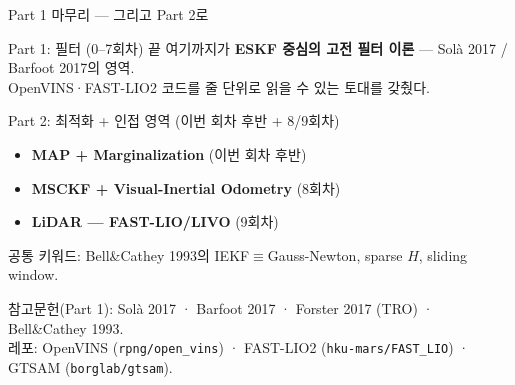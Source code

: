 \begin{frame}{Part 1 마무리 — 그리고 Part 2로}
  \begin{block}{Part 1: 필터 (0--7회차) 끝}
    여기까지가 \textbf{ESKF 중심의 고전 필터 이론} — Solà 2017 / Barfoot 2017의 영역.\\
    OpenVINS·FAST-LIO2 코드를 줄 단위로 읽을 수 있는 토대를 갖췄다.
  \end{block}
  \vspace{0.4em}
  \pause
  \begin{alertblock}{Part 2: 최적화 + 인접 영역 (이번 회차 후반 + 8/9회차)}
    \begin{itemize}
      \item \textbf{MAP + Marginalization} (이번 회차 후반)
      \item \textbf{MSCKF + Visual-Inertial Odometry} (8회차)
      \item \textbf{LiDAR — FAST-LIO/LIVO} (9회차)
    \end{itemize}
    공통 키워드: Bell\&Cathey 1993의 IEKF$\equiv$Gauss-Newton, sparse $H$, sliding window.
  \end{alertblock}
  \vspace{0.3em}
  \scriptsize 참고문헌(Part 1): Solà 2017 · Barfoot 2017 · Forster 2017 (TRO) · Bell\&Cathey 1993.\\
  레포: OpenVINS (\texttt{rpng/open\_vins}) · FAST-LIO2 (\texttt{hku-mars/FAST\_LIO}) · GTSAM (\texttt{borglab/gtsam}).
\end{frame}


